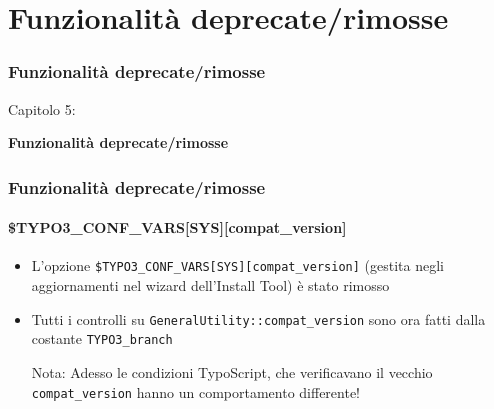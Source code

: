 %

\section{Funzionalità deprecate/rimosse}
\begin{frame}[fragile]
	\frametitle{Funzionalità deprecate/rimosse}

	\begin{center}\huge{Capitolo 5:}\end{center}
	\begin{center}\huge{\color{typo3darkgrey}\textbf{Funzionalità deprecate/rimosse}}\end{center}

\end{frame}


\begin{frame}[fragile]
	\frametitle{Funzionalità deprecate/rimosse}
	\framesubtitle{\$TYPO3\_CONF\_VARS[SYS][compat\_version]}

	\begin{itemize}

		\item L'opzione \texttt{\$TYPO3\_CONF\_VARS[SYS][compat\_version]} (gestita negli aggiornamenti
			nel wizard dell'Install Tool) è stato rimosso

		\item Tutti i controlli su \texttt{GeneralUtility::compat\_version} sono ora fatti dalla
			costante \texttt{TYPO3\_branch}

			\vspace{0.2cm}

			\begingroup
				\color{red}
					Nota: Adesso le condizioni TypoScript, che verificavano il vecchio \texttt{compat\_version}
					hanno un comportamento differente!
			\endgroup

	\end{itemize}

\end{frame}

